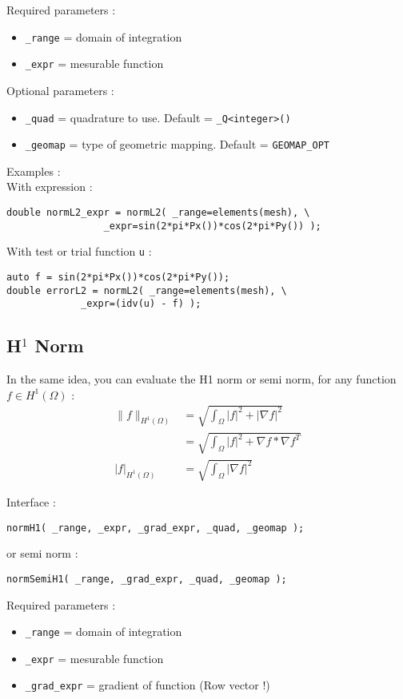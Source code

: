 \noindent Required parameters :
\begin{itemize}
 \item \lstinline!_range! = domain of integration
 \item \lstinline!_expr! = mesurable function
\end{itemize}

\noindent Optional parameters :
\begin{itemize}
 \item \lstinline!_quad! = quadrature to use. Default = \lstinline!_Q<integer>()!
 \item \lstinline!_geomap! = type of geometric mapping. Default = \lstinline!GEOMAP_OPT!
\end{itemize}

\noindent Examples :\\
With expression :
\begin{lstlisting}
double normL2_expr = normL2( _range=elements(mesh), \
			     _expr=sin(2*pi*Px())*cos(2*pi*Py()) );
\end{lstlisting}
With test or trial function \lstinline!u! :
\begin{lstlisting}
auto f = sin(2*pi*Px())*cos(2*pi*Py());
double errorL2 = normL2( _range=elements(mesh), \
			 _expr=(idv(u) - f) );
\end{lstlisting}


\subsection{H$^1$ Norm}
In the same idea, you can evaluate the H1 norm or semi norm, for any function $f \in H^1(\Omega)$ :
\begin{align*}
 \parallel f \parallel_{H^1(\Omega)}&=\sqrt{\int_\Omega |f|^2+|\nabla f|^2}\\
&=\sqrt{\int_\Omega |f|^2+\nabla f*\nabla f^T}\\
|f|_{H^1(\Omega)}&=\sqrt{\int_\Omega |\nabla f|^2}
\end{align*}

\label{keywords:normH1}
\noindent Interface :
\begin{lstlisting}
normH1( _range, _expr, _grad_expr, _quad, _geomap );
\end{lstlisting}
or semi norm :
\begin{lstlisting}
normSemiH1( _range, _grad_expr, _quad, _geomap );
\end{lstlisting}

\noindent Required parameters :
\begin{itemize}
 \item \lstinline!_range! = domain of integration
 \item \lstinline!_expr! = mesurable function
 \item \lstinline!_grad_expr! = gradient of function (Row vector !)
\end{itemize}

